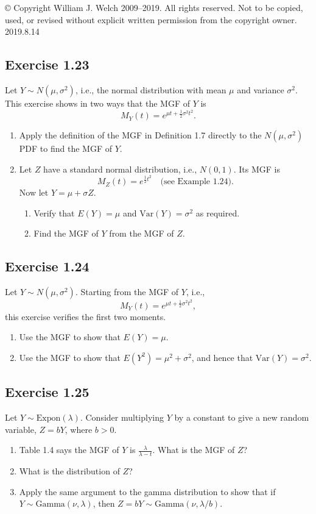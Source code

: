 \documentclass{book}
\begin{document}
© Copyright William J. Welch 2009--2019. All rights reserved. Not to be copied, used, or revised without explicit written permission from the copyright owner. 2019.8.14

\subsection{Exercise 1.23}
Let $Y \sim N(\mu, \sigma^2)$, i.e., the normal distribution with mean $\mu$ and variance $\sigma^2$. This exercise shows in two ways that the MGF of $Y$ is 
\[
M_Y(t) = e^{\mu t + \frac{1}{2} \sigma^2 t^2}.
\]
\begin{enumerate}
    \item Apply the definition of the MGF in Definition 1.7 directly to the $N(\mu, \sigma^2)$ PDF to find the MGF of $Y$.
    \item Let $Z$ have a standard normal distribution, i.e., $N(0, 1)$. Its MGF is 
    \[
    M_Z(t) = e^{\frac{1}{2} t^2} \quad \text{(see Example 1.24)}.
    \]
    Now let $Y = \mu + \sigma Z$.
    \begin{enumerate}
        \item Verify that $E(Y) = \mu$ and $\text{Var}(Y) = \sigma^2$ as required. 
        \item Find the MGF of $Y$ from the MGF of $Z$.
    \end{enumerate}
\end{enumerate}

\subsection{Exercise 1.24}
Let $Y \sim N(\mu, \sigma^2)$. Starting from the MGF of $Y$, i.e., 
\[
M_Y(t) = e^{\mu t + \frac{1}{2} \sigma^2 t^2},
\]
this exercise verifies the first two moments.
\begin{enumerate}
    \item Use the MGF to show that $E(Y) = \mu$.
    \item Use the MGF to show that $E(Y^2) = \mu^2 + \sigma^2$, and hence that $\text{Var}(Y) = \sigma^2$.
\end{enumerate}

\subsection{Exercise 1.25}
Let $Y \sim \text{Expon}(\lambda)$. Consider multiplying $Y$ by a constant to give a new random variable, $Z = bY$, where $b > 0$.
\begin{enumerate}
    \item Table 1.4 says the MGF of $Y$ is $\frac{\lambda}{\lambda - t}$. What is the MGF of $Z$? 
    \item What is the distribution of $Z$? 
    \item Apply the same argument to the gamma distribution to show that if $Y \sim \text{Gamma}(\nu, \lambda)$, then $Z = bY \sim \text{Gamma}(\nu, \lambda/b)$.
\end{enumerate}
\end{document}
